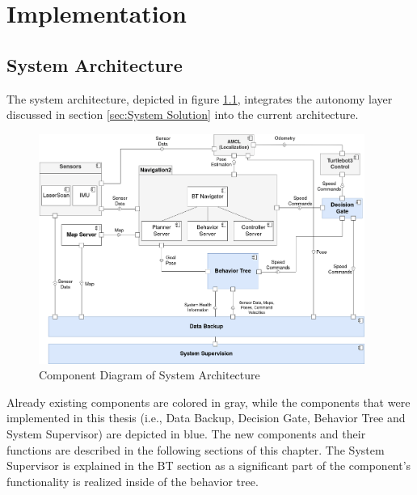 \chapter{Implementation}
\label{cha:implementierung}

\section{System Architecture}

The system architecture, depicted in figure \ref{fig:component_diagram}, integrates the autonomy layer discussed in section \ref{sec:System Solution} into the current architecture. 


\begin{figure}[ht]
	\centering
	\includegraphics[width=0.95\textwidth]{images/component_diagram_bt.png}
	\caption{Component Diagram of System Architecture}
	\label{fig:component_diagram}
\end{figure}

Already existing components are colored in gray, while the components that were implemented in this thesis (i.e., Data Backup, Decision Gate, Behavior Tree and System Supervisor) are depicted in blue. The new components and their functions are described in the following sections of this chapter. The System Supervisor is explained in the BT section as a significant part of the component's functionality is realized inside of the behavior tree.

